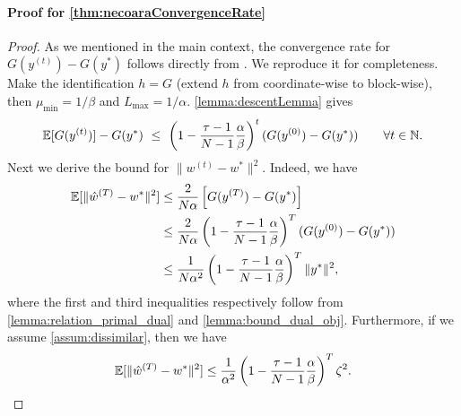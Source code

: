 \paragraph{Proof for \autoref{thm:necoaraConvergenceRate} }
\begin{proof}
    As we mentioned in the main context, the convergence rate for $G(y^{(t)}) - G(y^*)$ follows directly from \citep{necoara2017random}. We reproduce it for completeness.
    Make the identification $h = G$ (extend $h$ from coordinate-wise to block-wise), then $\mu_{\min} = 1/\beta$ and $L_{\max} = 1/\alpha$. \autoref{lemma:descentLemma} gives
    \begin{align*}
        \mathbb{E} [G( y^{(t)} )] - G(y^*) ~\leq~ \left( 1 - \frac{\tau-1}{N-1} \frac{\alpha}{\beta}  \right)^t ( G( y^{(0)} ) - G(y^*) ) \qquad \forall t \in \mathbb{N}. 
    \end{align*}
    Next we derive the bound for $\|w^{(t)} - w^*\|^2$. Indeed, we have
    \begin{align*}
        \mathbb{E}[\|\hat w^{(T)} - w^*\|^2] &\leq \frac{2}{N \alpha}\left[G(y^{(T)}) - G(y^*) \right]
        \\&\leq \frac{2}{N \alpha} \left( 1 - \frac{\tau - 1}{N-1} \frac{\alpha}{\beta} \right)^{T} ( G(y^{(0)}) - G(y^*) )
        \\&\leq \frac{1}{N \alpha^2} \left( 1 - \frac{\tau - 1}{N-1} \frac{\alpha}{\beta} \right)^{T} \|y^*\|^2,
    \end{align*}
    where the first and third inequalities respectively follow from \autoref{lemma:relation_primal_dual} and \autoref{lemma:bound_dual_obj}. 
    Furthermore, if we assume \autoref{assum:dissimilar}, then we have 
    \[\mathbb{E}[\|\hat w^{(T)} - w^*\|^2] \leq \frac{1}{\alpha^2} \left( 1 - \frac{\tau - 1}{N-1} \frac{\alpha}{\beta} \right)^{T} \zeta^2.\]
\end{proof}



